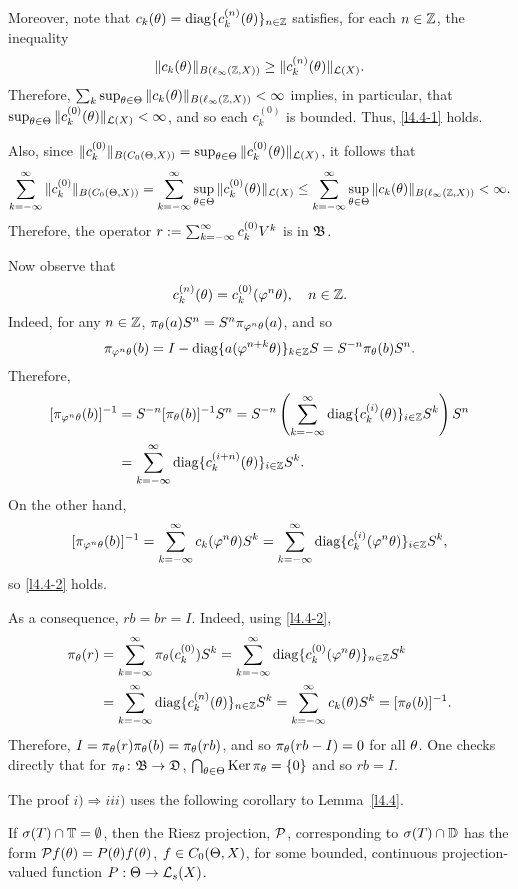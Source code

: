 \begin{pf}
Moreover, note that $c_k(\theta)=\operatorname{diag}\{c_k^{(n)}(\theta)\}_{n\in{\Bbb{Z}}}$
satisfies, for each $n\in{\Bbb{Z}}$, the inequality
\[\|c_k(\theta)\|_{B(\ell_\infty({\Bbb{Z}},X))}\ge\|c_k^{(n)}(\theta)\|_{{\cal{L}}(X)}.\]
  Therefore,
 $\sum_k \sup_{\theta\in \Theta} \|c_k(\theta)\|_{B(\ell_\infty({\Bbb{Z}},X))} < \infty$
implies, in particular, that
$\sup_{\theta\in \Theta} \|c^{(0)}_k(\theta) \|_{{\cal{L}}(X)} < \infty$, and so
each $c_k^{(0)}$ is bounded.  Thus, \eqref{l4.4-1} holds.


Also, since
$\|c^{(0)}_k\|_{B(C_0(\Theta,X))}=\sup_{\theta\in \Theta}\|c^{(0)}_k(\theta)\|_{{\cal{L}}(X)}$,
it follows that
$$\sum_{k=-\infty}^\infty \|c^{(0)}_k \|_{B(C_0(\Theta,X))}
=\sum_{k=-\infty}^\infty\sup_{\theta\in \Theta}\|c^{(0)}_k(\theta)\|_{{\cal{L}}(X)}
\le \sum_{k=-\infty}^\infty\sup_{\theta\in \Theta}\|c_k(\theta)\|_{B(\ell_\infty({\Bbb{Z}},X))} < \infty.$$
Therefore, the operator $r:=\sum_{k=-\infty}^\infty c^{(0)}_k V^k$ is in ${\frak{B}}$.

Now observe that
\begin{equation}\lb{l4.4-2}
c^{(n)}_k(\th) = c^{(0)}_k (\vphi^n\th), \quad n\in \bbZ.
\end{equation}
Indeed, for any $n\in {\Bbb{Z}}$, $\pi_\theta(a)S^n=S^n\pi_{\varphi^n\theta}(a)$,
and so
\[ \pi_{\varphi^n\theta} (b)
 =I-\operatorname{diag}\{a(\varphi^{n+k}\theta)\}_{k\in{\Bbb{Z}}}S
 =S^{-n} \pi_\theta(b)S^n. \]
Therefore,
$$\begin{aligned}
[\pi_{\vphi^n\th}(b)]^{-1} &= S^{-n}[\pi_\th(b)]^{-1}S^{n}
=S^{-n}\left(\sumk\diag\{c^{(i)}_k(\th)\}_{i\in \bbZ}
  S^k\right)S^{n}\\
&=\sumk\diag\{c^{(i+n)}_k(\th)\}_{i\in\bbZ}S^k.
\end{aligned}$$
On the other hand,
\[
[\pi_{\varphi^n\theta}(b)]^{-1}= \sum_{k=-\infty}^\infty c_k(\varphi^n\theta)S^k=
\sum_{k=-\infty}^\infty\operatorname{diag}\{c^{(i)}_k
(\varphi^n\theta)\}_{i\in{\Bbb{Z}}}S^k,\]
so \eqref{l4.4-2} holds.

As a consequence, $rb=br=I$.  Indeed, using \eqref{l4.4-2},
$$\begin{aligned}
\pi_\theta(r) &= \sum_{k=-\infty}^\infty \pi_\theta(c^{(0)}_k) S^k
= \sum_{k=-\infty}^\infty \operatorname{diag}\{c^{(0)}_k(\varphi^n\theta)\}_{n\in{\Bbb{Z}}}S^k \\
 &= \sum_{k=-\infty}^\infty \operatorname{diag}\{c^{(n)}_k(\theta)\}_{n\in{\Bbb{Z}}}S^k
=\sum_{k=-\infty}^\infty c_k(\theta)S^k = [\pi_\theta(b)]^{-1}.
\end{aligned}$$
Therefore, $I=\pi_\theta(r)\pi_\theta(b) = \pi_\theta(rb)$, and so
$\pi_\theta(rb-I) = 0$ for all $\theta$.
One checks directly that for
$\pi_\theta\colon{\frak{B}}\to{\frak{D}}$, $\bigcap_{\theta\in \Theta}\operatorname{Ker}\pi_\theta=\{0\}$ and
so $rb=I$. \end{pf}

The  proof $i)\Rightarrow iii)$  uses  the
following corollary to  Lemma~\ref{l4.4}.

\begin{cor} If $\sigma(T)\cap{\Bbb{T}} = \emptyset$,
then the Riesz projection, ${\cal{P}}$, corresponding to $\sigma(T)
\cap {\Bbb{D}}$ has the form ${\cal{P}} f(\theta)=P(\theta)f(\theta)$, $f\in C_0(\Theta,X)$, for some
bounded, continuous projection-valued function $P:\Theta\to {\cal{L}}_s(X)$.
\end{cor}

